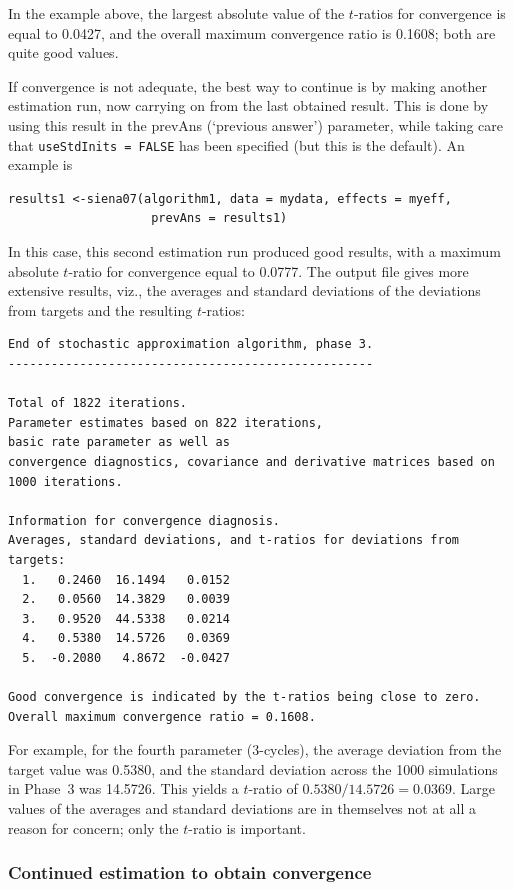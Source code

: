 \documentclass[a4paper,fleqn,11pt]{article}
\newcommand{\+}{\, + \,}
\begin{document}
In the example above, the largest absolute value of the $t$-ratios for convergence
is equal to 0.0427, and the overall maximum convergence ratio is 0.1608;
both are quite good values.

If convergence is not adequate, the best way to continue
is by making another estimation run,
now carrying on from the last obtained result. This is done by
using this result in the \textsf{prevAns} (`previous answer')
parameter, while taking care that  \texttt{useStdInits = FALSE}
has been specified (but this is the default). An example is
\begin{verbatim}
results1 <-siena07(algorithm1, data = mydata, effects = myeff,
                    prevAns = results1)
\end{verbatim}
In this case, this second estimation run produced good results, with a
maximum absolute   $t$-ratio for convergence equal to 0.0777.
The output file gives more extensive results, viz.,
 the averages and standard deviations of the
deviations from targets and the resulting $t$-ratios:

{\footnotesize
\begin{verbatim}
End of stochastic approximation algorithm, phase 3.
---------------------------------------------------

Total of 1822 iterations.
Parameter estimates based on 822 iterations,
basic rate parameter as well as
convergence diagnostics, covariance and derivative matrices based on 1000 iterations.

Information for convergence diagnosis.
Averages, standard deviations, and t-ratios for deviations from targets:
  1.   0.2460  16.1494   0.0152
  2.   0.0560  14.3829   0.0039
  3.   0.9520  44.5338   0.0214
  4.   0.5380  14.5726   0.0369
  5.  -0.2080   4.8672  -0.0427

Good convergence is indicated by the t-ratios being close to zero.
Overall maximum convergence ratio = 0.1608.
\end{verbatim}
}
For example, for the fourth parameter (3-cycles), the average deviation
from the target value was 0.5380, and the standard deviation across the
1000 simulations in Phase~3 was  14.5726. This yields a $t$-ratio
of $ 0.5380 / 14.5726 = 0.0369$.
Large values of the averages and standard deviations are
in themselves not at all a reason for concern; only the
$t$-ratio is important.

\subsubsection{Continued estimation to obtain convergence}
\label{S_contconv}
\end{document}
